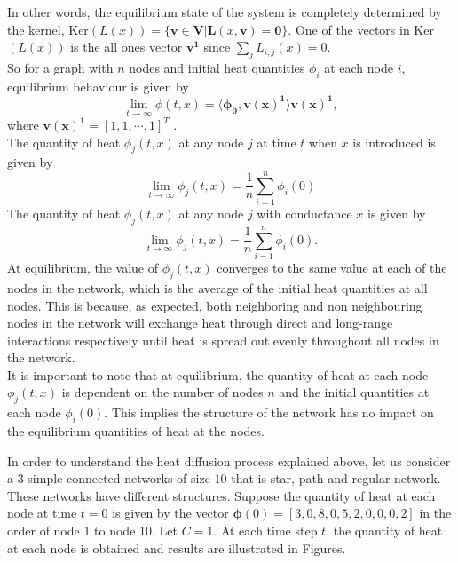 \documentclass[10pt,a4paper]{article}
\begin{document}
In other words, the equilibrium state of the system is completely determined by the kernel, Ker$(L(x))= \{ \mathbf{v} \in \mathbf{V} | \mathbf{L}(x,\mathbf{v}) = \mathbf{0} \}$. One of the vectors in Ker$(L(x))$ is the all ones vector $\mathbf{v^1}$ since $\sum_j L_{i,j} (x) = 0$.\\
So for a graph with $n$ nodes and initial heat quantities  $\phi_i$ at each node $i$, equilibrium behaviour is given by
\begin{equation*}
\lim_{t \longrightarrow \infty} \phi(t,x) = \langle \mathbf{\phi_0}, \mathbf{v(x) ^1}\rangle \mathbf{v(x)^1},
\end{equation*}
 where $\mathbf{v(x)^1} = [1,1,\cdots,1]^T$ .\\
The quantity of heat $\phi_{j} (t,x)$ at any node $j$ at time $t$ when $x$ is introduced is given by\\
\begin{equation*}
\lim_{t \longrightarrow \infty} \phi_{j}(t,x) = \frac{1}{n} \sum_{i=1}^{n} \phi_{i} (0)
\end{equation*}
The quantity of heat $\phi_j(t,x)$ at any node $j$ with conductance $x$ is given by
\begin{equation}
\lim_{t \to \infty}\phi_j(t,x) = \frac{1}{n} \sum_{i = 1}^n \phi_i(0).
\label{equili-eqn} 
\end{equation}
At equilibrium, the value of $\phi_{j}(t,x)$ converges to the same value at each of the nodes in the network, which is the average of the initial heat quantities at all nodes. This is because, as expected, both neighboring and non neighbouring nodes in the network will exchange heat through direct and long-range interactions respectively until heat is spread out evenly throughout all nodes in the network.\\
It is important to note that at equilibrium, the quantity of heat at each node $\phi_j(t,x)$ is dependent on the number of nodes $n$ and the initial quantities at each node $\phi_i(0)$. This implies the structure of the network has no impact on the equilibrium quantities of heat at the nodes.

In order to understand the heat diffusion process explained above, let us consider a $3$ simple connected networks of size $10$ that is star, path and regular network. These networks have different structures. Suppose the quantity of heat at each node at time $t=0$ is given by the vector $\boldsymbol{\phi}(0)= [3,0,8,0,5,2,0,0,0,2]$ in the order of node 1 to node 10. Let $C=1$. At each time step $t$, the quantity of heat at each node is obtained and results are illustrated in Figures.
\end{document}
